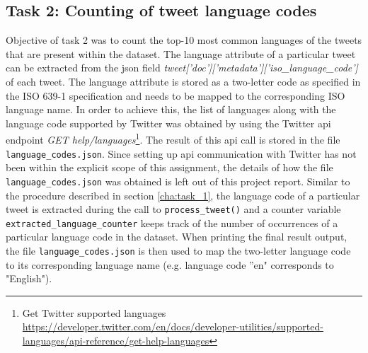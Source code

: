 \documentclass[paper=a4, fontsize=11pt]{scrartcl}
\numberwithin{equation}{section}		%
\numberwithin{figure}{section}			%
\numberwithin{table}{section}				%
\begin{document}
\subsection{Task 2: Counting of tweet language codes} 
Objective of task 2 was to count the top-10 most common languages of the tweets that are present within the dataset. The language attribute of a particular tweet can be extracted from the \acrshort{json} field \emph{tweet['doc']['metadata']['iso\_language\_code']} of each tweet. The language attribute is stored as a two-letter code as specified in the ISO 639-1 specification \citep{RN311} and needs to be mapped to the corresponding ISO language name. 
\newline
In order to achieve this, the list of languages along with the language code supported by Twitter was obtained by using the Twitter \acrfull{api} endpoint \emph{GET help/languages}\footnote{Get Twitter supported languages \url{https://developer.twitter.com/en/docs/developer-utilities/supported-languages/api-reference/get-help-languages}}. The result of this \acrshort{api} call is stored in the file \texttt{language\_codes.json}. Since setting up \acrshort{api} communication with Twitter has not been within the explicit scope of this assignment, the details of how the file \texttt{language\_codes.json} was obtained is left out of this project report.
\newline
Similar to the procedure described in section \ref{cha:task_1}, the language code of a particular tweet is extracted during the call to \texttt{process\_tweet()} and a counter variable \texttt{extracted\_language\_counter} keeps track of the number of occurrences of a particular language code in the dataset. When printing the final result output, the file \texttt{language\_codes.json} is then used to map the two-letter language code to its corresponding language name (e.g.  language code ''en" corresponds to "English").
\end{document}
